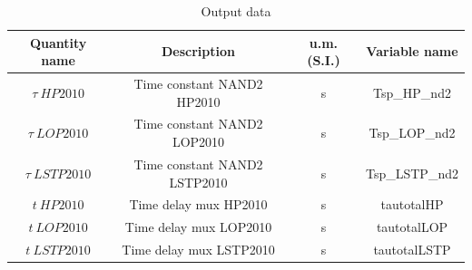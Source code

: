 \begin{table}[h]
	\begin{center}
		\begin{tabular}{|c|c|c|c|} \hline
			\textbf{Quantity name} & \textbf{Description} & \textbf{u.m. (S.I.)} & \textbf{Variable name} \\ \hline
			$\tau \ HP2010$ &Time constant NAND2 HP2010 & s & Tsp\_HP\_nd2 \\
			$\tau \ LOP2010$ &Time constant NAND2 LOP2010 & s & Tsp\_LOP\_nd2 \\
			$\tau \ LSTP2010$ &Time constant NAND2 LSTP2010 & s & Tsp\_LSTP\_nd2 \\ 
			$t \ HP2010$ &Time delay mux HP2010 & s & tautotalHP \\
			$t \ LOP2010$ &Time delay mux LOP2010 & s & tautotalLOP \\
			$t \ LSTP2010$ &Time delay mux LSTP2010 & s & tautotalLSTP \\ \hline
		\end{tabular}
	\end{center}
	\caption{Output data}
	\label{tab1}
\end{table}
